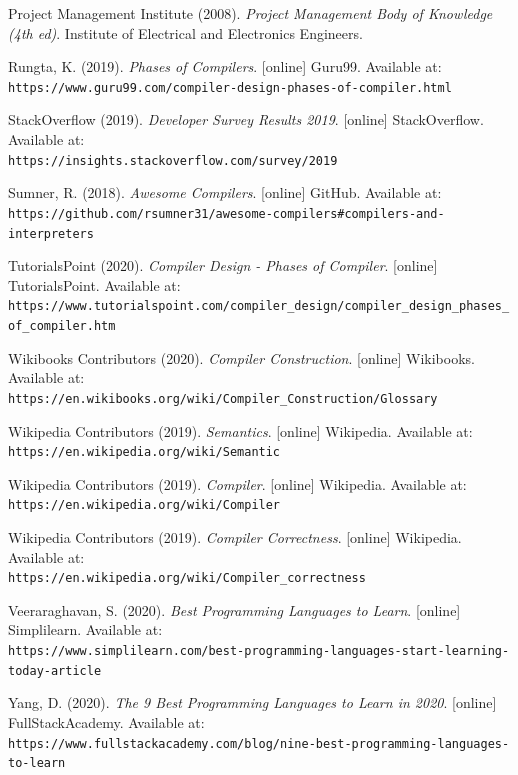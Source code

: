 \documentclass[
]{report}
\begin{document}
\begin{thebibliography}{9}
	Project Management Institute (2008).
	\textit{Project Management Body of Knowledge (4th ed)}.
	Institute of Electrical and Electronics Engineers.
	
	Rungta, K. (2019).
	\textit{Phases of Compilers}.
	[online] Guru99. Available at:
	\\\texttt{https://www.guru99.com/compiler-design-phases-of-compiler.html}
	
	StackOverflow (2019).
	\textit{Developer Survey Results 2019}.
	[online] StackOverflow. Available at:
	\\\texttt{https://insights.stackoverflow.com/survey/2019}
	
	Sumner, R. (2018).
	\textit{Awesome Compilers}.
	[online] GitHub. Available at:
	\\\texttt{https://github.com/rsumner31/awesome-compilers\#compilers-and-interpreters}
	
	TutorialsPoint (2020).
	\textit{Compiler Design - Phases of Compiler}.
	[online] TutorialsPoint. Available at:
	\\\texttt{https://www.tutorialspoint.com/compiler\_design/compiler\_design\_phases\_of\_compiler.htm}
	
	Wikibooks Contributors (2020).
	\textit{Compiler Construction}.
	[online] Wikibooks. Available at:
	\\\texttt{https://en.wikibooks.org/wiki/Compiler\_Construction/Glossary}
	
	Wikipedia Contributors (2019).
	\textit{Semantics}.
	[online] Wikipedia. Available at:
	\\\texttt{https://en.wikipedia.org/wiki/Semantic}
	
	Wikipedia Contributors (2019).
	\textit{Compiler}.
	[online] Wikipedia. Available at:
	\\\texttt{https://en.wikipedia.org/wiki/Compiler}
	
	Wikipedia Contributors (2019).
	\textit{Compiler Correctness}.
	[online] Wikipedia. Available at:
	\\\texttt{https://en.wikipedia.org/wiki/Compiler\_correctness}
	
	Veeraraghavan, S. (2020).
	\textit{Best Programming Languages to Learn}.
	[online] Simplilearn. Available at:
	\\\texttt{https://www.simplilearn.com/best-programming-languages-start-learning-today-article}
	
	Yang, D. (2020).
	\textit{The 9 Best Programming Languages to Learn in 2020}.
	[online] FullStackAcademy. Available at:
	\\\texttt{https://www.fullstackacademy.com/blog/nine-best-programming-languages-to-learn}

\end{thebibliography}
\end{document}
